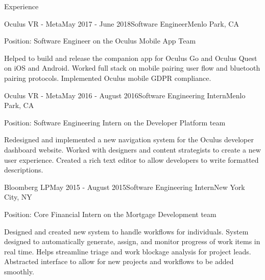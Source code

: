 \documentclass{resume} %
\begin{document}

\begin{rSection}{Experience}

  \begin{rSubsection}{Oculus VR - Meta}{May 2017 - June 2018}{Software Engineer}{Menlo Park, CA}
  \item Position: Software Engineer on the Oculus Mobile App Team
  \item Helped to build and release the companion app for Oculus Go and Oculus Quest on iOS and Android. Worked full stack on mobile pairing user flow and bluetooth pairing protocols. Implemented Oculus mobile GDPR compliance. 
  \end{rSubsection}


  \begin{rSubsection}{Oculus VR - Meta}{May 2016 - August 2016}{Software Engineering Intern}{Menlo Park, CA}
  \item Position: Software Engineering Intern on the Developer Platform team
  \item Redesigned and implemented a new navigation system for the Oculus developer dashboard website. Worked with designers and content strategists to create a new user experience. Created a rich text editor to allow developers to write formatted descriptions. 
  \end{rSubsection}



  \begin{rSubsection}{Bloomberg LP}{May 2015 - August 2015}{Software Engineering Intern}{New York City, NY}
  \item Position: Core Financial Intern on the Mortgage Development team
  \item Designed and created new system to handle workflows for individuals. System designed to automatically generate, assign, and monitor progress of work items in real time. Helps streamline triage and work blockage analysis for project leads. Abstracted interface to allow for new projects and workflows to be added smoothly. 
\end{rSubsection}


\end{rSection}
\end{document}
